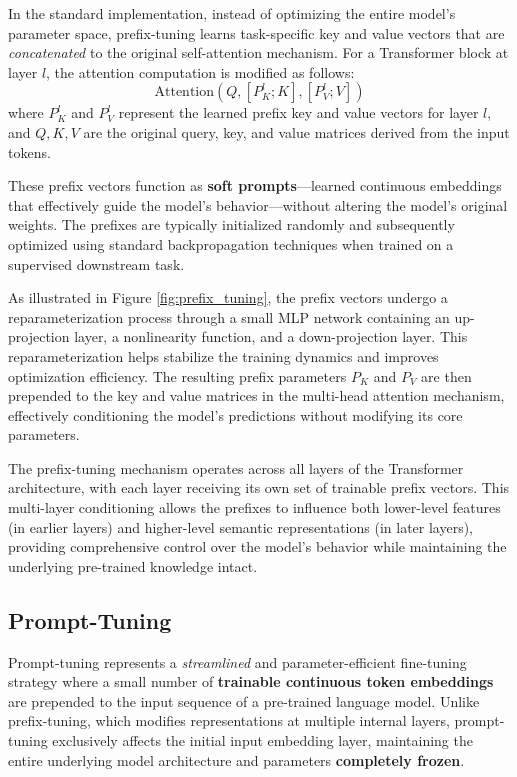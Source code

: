In the standard implementation, instead of optimizing the entire model's parameter space, prefix-tuning learns task-specific key and value vectors that are \textit{concatenated} to the original self-attention mechanism. For a Transformer block at layer \( l \), the attention computation is modified as follows:
\[
\text{Attention}(Q, [P_K^l; K], [P_V^l; V])
\]
where \( P_K^l \) and \( P_V^l \) represent the learned prefix key and value vectors for layer \( l \), and \( Q, K, V \) are the original query, key, and value matrices derived from the input tokens.

These prefix vectors function as \textbf{soft prompts}—learned continuous embeddings that effectively guide the model's behavior—without altering the model's original weights. The prefixes are typically initialized randomly and subsequently optimized using standard backpropagation techniques when trained on a supervised downstream task.

As illustrated in Figure \ref{fig:prefix_tuning}, the prefix vectors undergo a reparameterization process through a small MLP network containing an up-projection layer, a nonlinearity function, and a down-projection layer. This reparameterization helps stabilize the training dynamics and improves optimization efficiency. The resulting prefix parameters $P_K$ and $P_V$ are then prepended to the key and value matrices in the multi-head attention mechanism, effectively conditioning the model's predictions without modifying its core parameters.

The prefix-tuning mechanism operates across all layers of the Transformer architecture, with each layer receiving its own set of trainable prefix vectors. This multi-layer conditioning allows the prefixes to influence both lower-level features (in earlier layers) and higher-level semantic representations (in later layers), providing comprehensive control over the model's behavior while maintaining the underlying pre-trained knowledge intact.

\subsection{Prompt-Tuning}
Prompt-tuning represents a \textit{streamlined} and parameter-efficient fine-tuning strategy where a small number of \textbf{trainable continuous token embeddings} are prepended to the input sequence of a pre-trained language model. Unlike prefix-tuning, which modifies representations at multiple internal layers, prompt-tuning exclusively affects the initial input embedding layer, maintaining the entire underlying model architecture and parameters \textbf{completely frozen}.

